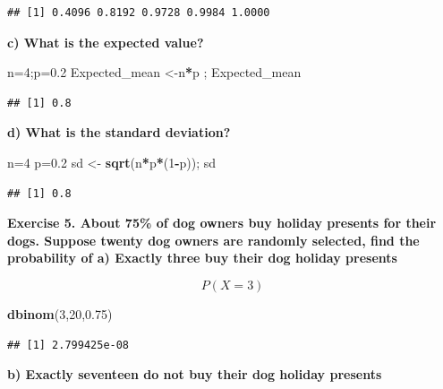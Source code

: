 \documentclass[
]{book}
\newenvironment{Shaded}{\begin{snugshade}}{\end{snugshade}}
\newcommand{\DecValTok}[1]{\textcolor[rgb]{0.00,0.00,0.81}{#1}}
\newcommand{\FloatTok}[1]{\textcolor[rgb]{0.00,0.00,0.81}{#1}}
\newcommand{\FunctionTok}[1]{\textcolor[rgb]{0.13,0.29,0.53}{\textbf{#1}}}
\newcommand{\NormalTok}[1]{#1}
\newcommand{\OtherTok}[1]{\textcolor[rgb]{0.56,0.35,0.01}{#1}}
\newcommand{\SpecialCharTok}[1]{\textcolor[rgb]{0.81,0.36,0.00}{\textbf{#1}}}
\begin{document}
\begin{verbatim}
## [1] 0.4096 0.8192 0.9728 0.9984 1.0000
\end{verbatim}

\textbf{c) What is the expected value?}

\begin{Shaded}
\begin{Highlighting}[]
\NormalTok{n}\OtherTok{=}\DecValTok{4}\NormalTok{;p}\OtherTok{=}\FloatTok{0.2}
\NormalTok{Expected\_mean }\OtherTok{\textless{}{-}}\NormalTok{n}\SpecialCharTok{*}\NormalTok{p ; Expected\_mean}
\end{Highlighting}
\end{Shaded}

\begin{verbatim}
## [1] 0.8
\end{verbatim}

\textbf{d) What is the standard deviation?}

\begin{Shaded}
\begin{Highlighting}[]
\NormalTok{n}\OtherTok{=}\DecValTok{4}
\NormalTok{p}\OtherTok{=}\FloatTok{0.2}
\NormalTok{sd }\OtherTok{\textless{}{-}} \FunctionTok{sqrt}\NormalTok{(n}\SpecialCharTok{*}\NormalTok{p}\SpecialCharTok{*}\NormalTok{(}\DecValTok{1}\SpecialCharTok{{-}}\NormalTok{p)); sd}
\end{Highlighting}
\end{Shaded}

\begin{verbatim}
## [1] 0.8
\end{verbatim}

\textbf{Exercise 5. About 75\% of dog owners buy holiday presents for their dogs. Suppose twenty dog owners are randomly selected, find the probability of a) Exactly three buy their dog holiday presents}

\[P(X=3)\]

\begin{Shaded}
\begin{Highlighting}[]
\FunctionTok{dbinom}\NormalTok{(}\DecValTok{3}\NormalTok{,}\DecValTok{20}\NormalTok{,}\FloatTok{0.75}\NormalTok{)}
\end{Highlighting}
\end{Shaded}

\begin{verbatim}
## [1] 2.799425e-08
\end{verbatim}

\textbf{b) Exactly seventeen do not buy their dog holiday presents}
\end{document}
